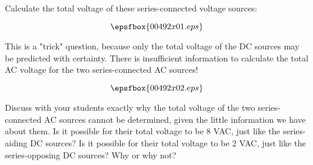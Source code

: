 

Calculate the total voltage of these series-connected voltage sources:

$$\epsfbox{00492x01.eps}$$







This is a "trick" question, because only the total voltage of the DC sources may be predicted with certainty.  There is insufficient information to calculate the total AC voltage for the two series-connected AC sources!

$$\epsfbox{00492x02.eps}$$







Discuss with your students exactly why the total voltage of the two series-connected AC sources cannot be determined, given the little information we have about them.  Is it possible for their total voltage to be 8 VAC, just like the series-aiding DC sources?  Is it possible for their total voltage to be 2 VAC, just like the series-opposing DC sources?  Why or why not?




